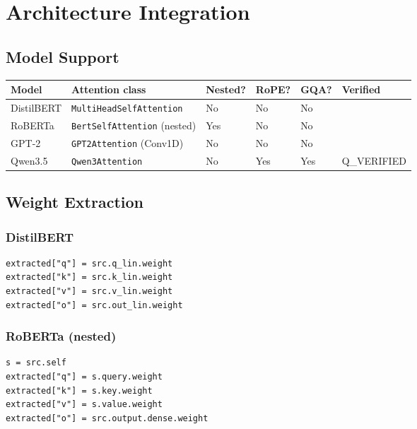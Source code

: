 
\section{Architecture Integration}

\subsection{Model Support}

\begin{table}[H]
\centering
\small
\begin{tabular}{llllll}
\toprule
\textbf{Model} & \textbf{Attention class} & \textbf{Nested?} & \textbf{RoPE?} & \textbf{GQA?} & \textbf{Verified} \\
\midrule
DistilBERT & \texttt{MultiHeadSelfAttention} & No & No & No &  \\
RoBERTa & \texttt{BertSelfAttention} (nested) & Yes & No & No &  \\
GPT-2 & \texttt{GPT2Attention} (Conv1D) & No & No & No &  \\
Qwen3.5 & \texttt{Qwen3Attention} & No & Yes & Yes & {{Q\_VERIFIED}} \\
\bottomrule
\end{tabular}
\end{table}

\subsection{Weight Extraction}

\subsubsection{DistilBERT}

\begin{lstlisting}
extracted["q"] = src.q_lin.weight
extracted["k"] = src.k_lin.weight
extracted["v"] = src.v_lin.weight
extracted["o"] = src.out_lin.weight
\end{lstlisting}

\subsubsection{RoBERTa (nested)}

\begin{lstlisting}
s = src.self
extracted["q"] = s.query.weight
extracted["k"] = s.key.weight
extracted["v"] = s.value.weight
extracted["o"] = src.output.dense.weight
\end{lstlisting}

